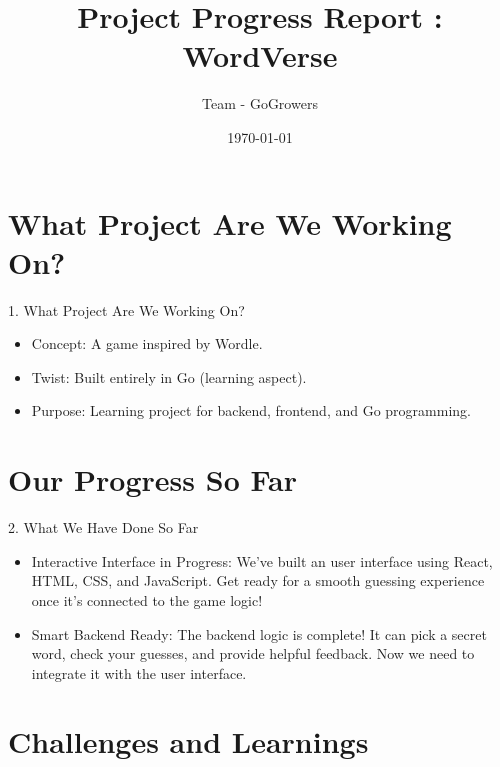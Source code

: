 \documentclass{beamer}
\title{Project Progress Report : WordVerse }
\author{Team - GoGrowers }
\date{\today}
\begin{document}
\begin{frame}
  \titlepage 
\end{frame}

\section{What Project Are We Working On?} 

\begin{frame}{1. What Project Are We Working On?}
  \begin{itemize}
    \item Concept: A game inspired by Wordle.
    \item Twist: Built entirely in Go (learning aspect).
    \item Purpose: Learning project for backend, frontend, and Go programming.
  \end{itemize}
\end{frame}

\section{Our Progress So Far}

\begin{frame}{2. What We Have Done So Far}
  \begin{itemize}
    \item Interactive Interface in Progress: We've built an user interface using React, HTML, CSS, and JavaScript. Get ready for a smooth guessing experience once it's connected to the game logic!
    \item Smart Backend Ready: The backend logic is complete! It can pick a secret word, check your guesses, and provide helpful feedback. Now we need to integrate it with the user interface.
  \end{itemize}
\end{frame}

\section{Challenges and Learnings} 
\end{document}
